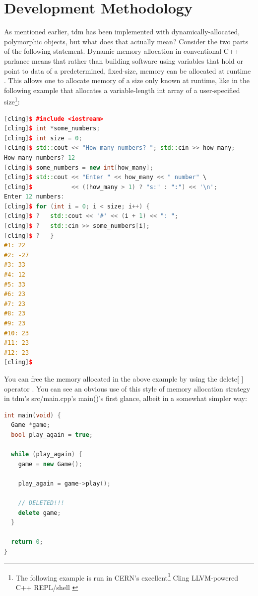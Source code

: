 \documentclass[man,12pt]{apa6}
\begin{document}
\clearpage

\section{Development Methodology}
As mentioned earlier, \textsf{tdm} has been implemented with
dynamically-allocated, polymorphic objects, but what does that actually mean?
Consider the two parts of the following statement.  Dynamic memory allocation in
conventional C++ parlance means that rather than building software using
variables that hold or point to data of a predetermined, fixed-size, memory can
be allocated at runtime \parencite{dymem-tut}.  This allows one to allocate
memory of a size only known at runtime, like in the following example that
allocates a variable-length \textsf{int} array of a user-specified
size\footnote{The following example is run in CERN's
excellent\footnote{} Cling LLVM-powered C++ REPL/shell
\parencite{cling,cling-news}}:

\begin{framed}
\begin{lstlisting}[language=C++]
[cling]$ #include <iostream>
[cling]$ int *some_numbers;
[cling]$ int size = 0;
[cling]$ std::cout << "How many numbers? "; std::cin >> how_many;
How many numbers? 12
[cling]$ some_numbers = new int[how_many];
[cling]$ std::cout << "Enter " << how_many << " number" \
[cling]$           << ((how_many > 1) ? "s:" : ":") << '\n';
Enter 12 numbers:
[cling]$ for (int i = 0; i < size; i++) {
[cling]$ ?   std::cout << '#' << (i + 1) << ": ";
[cling]$ ?   std::cin >> some_numbers[i];
[cling]$ ?   }
#1: 22
#2: -27
#3: 33
#4: 12
#5: 33
#6: 23
#7: 23
#8: 23
#9: 23
#10: 23
#11: 23
#12: 23
[cling]$
\end{lstlisting}
\end{framed}

You can free the memory allocated in the above example by using the
\textsf{delete[ ]}
operator \parencite{dymem-tut}.  You can see an obvious use of this style of
memory allocation strategy in \textsf{tdm}'s \textsf{src/main.cpp}'s
\textsf{main()}'s first glance, albeit in a somewhat simpler way:

\begin{framed}
\begin{lstlisting}[language=C++]
int main(void) {
  Game *game;
  bool play_again = true;

  while (play_again) {
    game = new Game();

    play_again = game->play();

    // DELETED!!!
    delete game;
  }

  return 0;
}
\end{lstlisting}
\end{framed}
\end{document}
